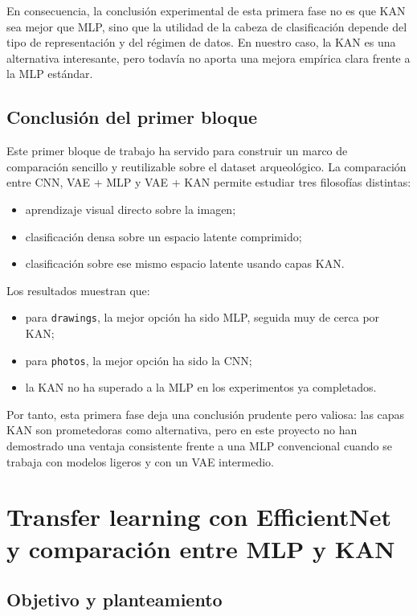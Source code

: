 \documentclass[11pt,a4paper]{report}
\begin{document}
En consecuencia, la conclusi\'on experimental de esta primera fase no es que KAN sea mejor que MLP, sino que la utilidad de la cabeza de clasificaci\'on depende del tipo de representaci\'on y del r\'egimen de datos. En nuestro caso, la KAN es una alternativa interesante, pero todav\'ia no aporta una mejora emp\'irica clara frente a la MLP est\'andar.

\section{Conclusi\'on del primer bloque}

Este primer bloque de trabajo ha servido para construir un marco de comparaci\'on sencillo y reutilizable sobre el dataset arqueol\'ogico. La comparaci\'on entre CNN, VAE + MLP y VAE + KAN permite estudiar tres filosof\'ias distintas:

\begin{itemize}
    \item aprendizaje visual directo sobre la imagen;
    \item clasificaci\'on densa sobre un espacio latente comprimido;
    \item clasificaci\'on sobre ese mismo espacio latente usando capas KAN.
\end{itemize}

Los resultados muestran que:

\begin{itemize}
    \item para \texttt{drawings}, la mejor opci\'on ha sido MLP, seguida muy de cerca por KAN;
    \item para \texttt{photos}, la mejor opci\'on ha sido la CNN;
    \item la KAN no ha superado a la MLP en los experimentos ya completados.
\end{itemize}

Por tanto, esta primera fase deja una conclusi\'on prudente pero valiosa: las capas KAN son prometedoras como alternativa, pero en este proyecto no han demostrado una ventaja consistente frente a una MLP convencional cuando se trabaja con modelos ligeros y con un VAE intermedio.

\chapter{Transfer learning con EfficientNet y comparaci\'on entre MLP y KAN}

\section{Objetivo y planteamiento}
\end{document}
